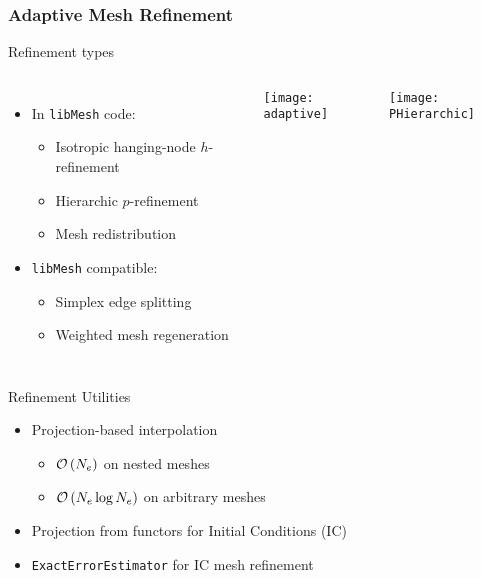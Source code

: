\documentclass[mathserif]{beamer}
\newcommand{\orderof}[1]{\ensuremath{ {\cal O}\left(#1\right)}}
\newcommand{\software}[1]{\texttt{#1}}
\newcommand{\libMesh}{\software{libMesh}}
\begin{document}
\begin{frame}
\frametitle{Adaptive Mesh Refinement}

\begin{block}{Refinement types}
\begin{columns}
\begin{itemize}
\item In \libMesh{} code:
\begin{itemize}
\item Isotropic hanging-node $h$-refinement
\item Hierarchic $p$-refinement
\item Mesh redistribution
\end{itemize}
\item \libMesh{} compatible:
\begin{itemize}
\item Simplex edge splitting
\item Weighted mesh regeneration
\end{itemize}
\end{itemize}
\center
\texttt{[image: adaptive]}

\center
\texttt{[image: PHierarchic]}
\end{columns}
\end{block}

\begin{block}{Refinement Utilities}
\begin{itemize}
\item Projection-based interpolation
\begin{itemize}
\item $\orderof{N_e}$ on nested meshes
\item $\orderof{N_e \log{N_e}}$ on arbitrary meshes
\end{itemize}
\item Projection from functors for Initial Conditions (IC)
\item {\texttt{ExactErrorEstimator}} for IC mesh refinement
\end{itemize}
\end{block}

\end{frame}
\end{document}
